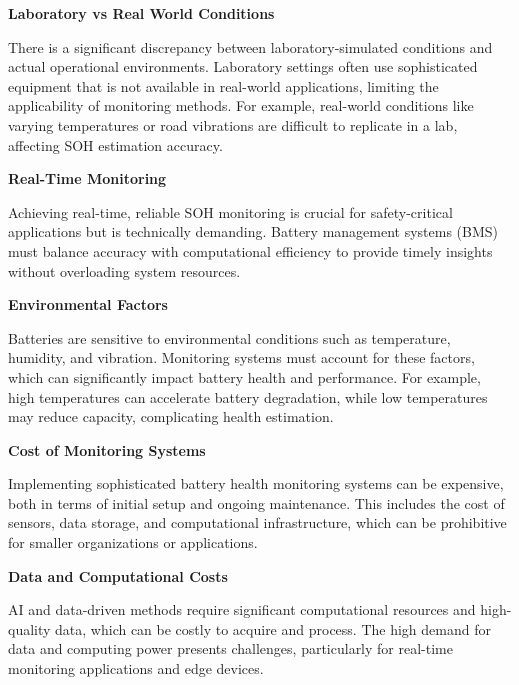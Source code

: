 \textbf{Laboratory vs Real World Conditions}

There is a significant discrepancy between laboratory-simulated conditions and actual operational environments. 
Laboratory settings often use sophisticated equipment that is not available in real-world applications, limiting the applicability of monitoring methods. For example, real-world conditions like varying temperatures or road vibrations are difficult to replicate in a lab, affecting SOH estimation accuracy.

\textbf{Real-Time Monitoring}

Achieving real-time, reliable SOH monitoring is crucial for safety-critical applications but is technically demanding. 
Battery management systems (BMS) must balance accuracy with computational efficiency to provide timely insights without overloading system resources.

\textbf{Environmental Factors}

Batteries are sensitive to environmental conditions such as temperature, humidity, and vibration. 
Monitoring systems must account for these factors, which can significantly impact battery health and performance. 
For example, high temperatures can accelerate battery degradation, while low temperatures may reduce capacity, complicating health estimation.

\textbf{Cost of Monitoring Systems}

Implementing sophisticated battery health monitoring systems can be expensive, both in terms of initial setup and ongoing maintenance. 
This includes the cost of sensors, data storage, and computational infrastructure, which can be prohibitive for smaller organizations or applications.

\textbf{Data and Computational Costs}

AI and data-driven methods require significant computational resources and high-quality data, which can be costly to acquire and process. 
The high demand for data and computing power presents challenges, particularly for real-time monitoring applications and edge devices.





